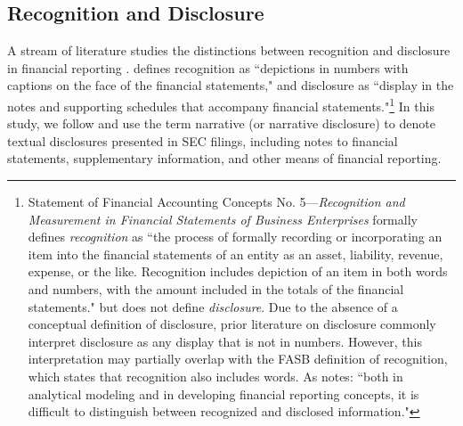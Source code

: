 \documentclass[letterpaper,12pt]{article}
\begin{document}
\begin{spacing}{1.5}
\subsection{Recognition and Disclosure} \label{sec2.1}
\noindent A stream of literature studies the distinctions between recognition and disclosure in financial reporting \cite{aboodyRecognitionDisclosureOil1996, barthMarketEffectsRecognition2003, schipperRequiredDisclosuresFinancial2007}.  defines recognition as ``depictions in numbers with captions on the face of the financial statements," and disclosure as ``display in the notes and supporting schedules that accompany financial statements."\footnote{Statement of Financial Accounting Concepts No. 5---\textit{Recognition and Measurement in Financial Statements of Business Enterprises} formally defines \textit{recognition} as ``the process of formally recording or incorporating an item into the financial statements of an entity as an asset, liability, revenue, expense, or the like. Recognition includes depiction of an item in both words and numbers, with the amount included in the totals of the financial statements." \cite[par. 6]{fasbStatementFinancialAccounting1984} but does not define \textit{disclosure}. Due to the absence of a conceptual definition of disclosure, prior literature on disclosure commonly interpret disclosure as any display that is not in numbers. However, this interpretation may partially overlap with the FASB definition of recognition, which states that recognition also includes words. As  notes: ``both in analytical modeling and in developing financial reporting concepts, it is difficult to distinguish between recognized and disclosed information."} In this study, we follow  and use the term narrative (or narrative disclosure) to denote textual disclosures presented in SEC filings, including notes to financial statements, supplementary information, and other means of financial reporting.


\end{spacing}
\end{document}
